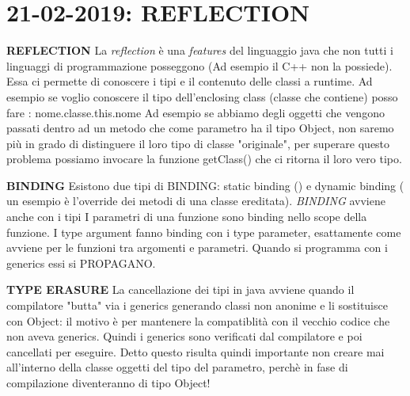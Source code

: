 

\newpage
\section{21-02-2019: REFLECTION}
\textbf{REFLECTION} \newline
La \textit{reflection} è una \textit{features} del linguaggio java che non tutti i linguaggi di programmazione posseggono (Ad esempio il C++ non la possiede). Essa ci permette di conoscere i tipi e il contenuto delle classi  a runtime. Ad esempio se voglio conoscere il tipo dell'enclosing class (classe che contiene) posso fare : nome.classe.this.nome  \newline
Ad esempio se abbiamo degli oggetti che vengono passati dentro ad un metodo che come parametro ha il tipo Object, non saremo più in grado di distinguere il loro tipo di classe "originale", per superare questo problema possiamo invocare la funzione getClass() che ci ritorna il loro vero tipo.

\noindent \textbf{BINDING} \newline
Esistono due tipi di BINDING: static binding () e dynamic binding ( un esempio è l'override dei metodi di una classe ereditata).\newline
\textit{BINDING} avviene anche con i tipi \newline
I parametri di una funzione sono binding nello scope della funzione.\newline
I type argument fanno binding con i type parameter, esattamente come avviene per le funzioni tra argomenti e parametri. \newline
Quando si programma con i generics essi si PROPAGANO. 

\noindent \textbf{TYPE ERASURE} \newline
La cancellazione dei tipi in java avviene quando il compilatore "butta" via i generics generando classi non anonime e li sostituisce con Object: il motivo è per mantenere la compatiblità con il vecchio codice che non aveva generics. Quindi i generics sono verificati dal compilatore e poi cancellati per eseguire. Detto questo risulta quindi importante non creare mai all'interno della classe oggetti del tipo del parametro, perchè in fase di compilazione diventeranno di tipo Object!














